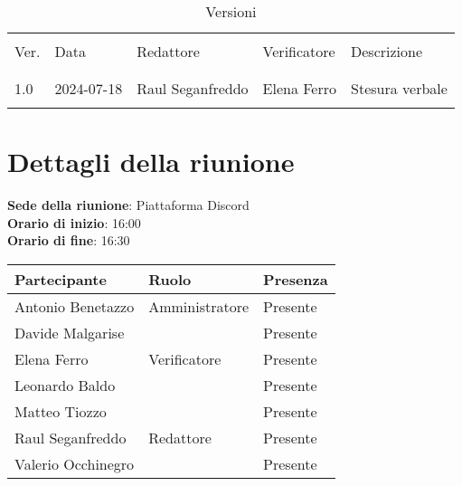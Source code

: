 \documentclass[italian,12pt]{article}
\begin{document}
\newcommand{\mySkip}[1][]{#1}



\newpage



\begin{table}[!h]
	\caption{Versioni}
	\footnotesize
	\begin{center}
		\begin{tabular}{ l l l l p{6cm} }
			\hline                                                                       \\[-2ex]
			Ver. & Data       & Redattore         & Verificatore       & Descrizione     \\
			\\[-2ex] \hline \\[-1.5ex]
			1.0  & 2024-07-18 & Raul Seganfreddo  & Elena Ferro        & Stesura verbale \\
			\\[-1.5ex] \hline
		\end{tabular}
	\end{center}
\end{table}

\newpage

\tableofcontents

\newpage

\section{Dettagli della riunione}

\textbf{Sede della riunione}: Piattaforma Discord\\
\textbf{Orario di inizio}: 16:00\\
\textbf{Orario di fine}: 16:30\\

\begin{flushleft}
	\begin{table}[!h]
		\begin{tabular}{ |l|l|l| }
			\hline
			\textbf{Partecipante} & \textbf{Ruolo} & \textbf{Presenza} \\
			\hline
			Antonio Benetazzo     & Amministratore & Presente          \\
			Davide Malgarise      &                & Presente          \\
			Elena Ferro           & Verificatore   & Presente          \\
			Leonardo Baldo        &                & Presente          \\
			Matteo Tiozzo         &                & Presente          \\
			Raul Seganfreddo      & Redattore      & Presente          \\
			Valerio Occhinegro    &                & Presente          \\
			\hline
		\end{tabular}
	\end{table}
\end{flushleft}
\end{document}

